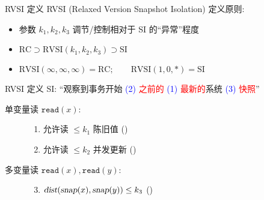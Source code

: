 \begin{frame}{RVSI 定义}
  RVSI {\small (Relaxed Version Snapshot Isolation)} 定义原则:
  \begin{itemize}
    \item<1-> 参数 $k_1, k_2, k_3$ 调节/控制相对于 SI 的``异常''程度
    \item<2-> $\text{RC} \supset \text{RVSI}(k_1, k_2, k_3) \supset \text{SI}$
    \item<2-> $\text{RVSI}(\infty,\infty,\infty) = \text{RC}; \qquad \text{RVSI}(1,0,\ast) = \text{SI}$
  \end{itemize}


\end{frame}
\begin{frame}{RVSI 定义}
  SI: ``观察到事务开始 \textcolor{blue}{\scriptsize (2) }\textcolor{red}{之前的} 
	\textcolor{blue}{\scriptsize (1) }\textcolor{red}{最新的}系统 \textcolor{blue}{\scriptsize (3) }\textcolor{red}{快照}''
  \begin{cdef}
	\vspace{5pt}

    \begin{description}
      \item[单变量读 $\texttt{read}(x)$:] \hfill 
        \begin{enumerate}
		  \item 允许读 $\le k_1$ 陈旧值 (\konebv{})
		  \item 允许读 $\le k_2$ 并发更新 (\ktwofv{})
        \end{enumerate}
      \item[多变量读 $\texttt{read}(x), \texttt{read}{(y)}$:] \hfill
        \begin{enumerate}
          \setcounter{enumi}{2}
		\item $\textsl{dist}(\textsl{snap}{(x)},\textsl{snap}{(y)}) \le k_3$ (\kthreesv{})
        \end{enumerate}
    \end{description}
  \end{cdef}
\end{frame}
